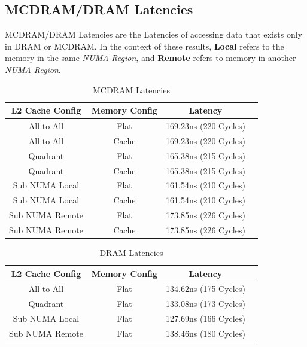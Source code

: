 \documentclass[bsc,frontabs,twoside,singlespacing,parskip,deptreport]{infthesis}     %
\begin{document}
\newpage
\subsection{MCDRAM/DRAM Latencies}
MCDRAM/DRAM Latencies are the Latencies of accessing data that exists only in DRAM or MCDRAM. In the context of these results, \textbf{Local} refers to the memory in the same \emph{NUMA Region}, and \textbf{Remote} refers to memory in another \emph{NUMA Region}.
\begin{table}[!h]
\begin{center}
\caption{MCDRAM Latencies}
\label{fig:mcdram-latencies}
\begin{tabular}{ |c|c|c|c| } 
    \hline
    L2 Cache Config & Memory Config & Latency \\
    \hline
    All-to-All      & Flat  & 169.23ns (220 Cycles) \\
    All-to-All      & Cache & 169.23ns (220 Cycles) \\
    Quadrant        & Flat  & 165.38ns (215 Cycles) \\
    Quadrant        & Cache & 165.38ns (215 Cycles) \\
    Sub NUMA Local  & Flat  & 161.54ns (210 Cycles) \\
    Sub NUMA Local  & Cache & 161.54ns (210 Cycles) \\ %
    Sub NUMA Remote & Flat  & 173.85ns (226 Cycles) \\
    Sub NUMA Remote & Cache & 173.85ns (226 Cycles) \\
    \hline
\end{tabular}
\end{center}
\end{table}

\begin{table}[!h]
\begin{center}
\caption{DRAM Latencies}
\label{fig:dram-latencies}
\begin{tabular}{ |c|c|c|c| } 
    \hline
    L2 Cache Config & Memory Config & Latency \\
    \hline
    All-to-All      & Flat  & 134.62ns (175 Cycles) \\
    Quadrant        & Flat  & 133.08ns (173 Cycles) \\
    Sub NUMA Local  & Flat  & 127.69ns (166 Cycles) \\
    Sub NUMA Remote & Flat  & 138.46ns (180 Cycles) \\
    \hline
\end{tabular}
\end{center}
\end{table}
\end{document}
